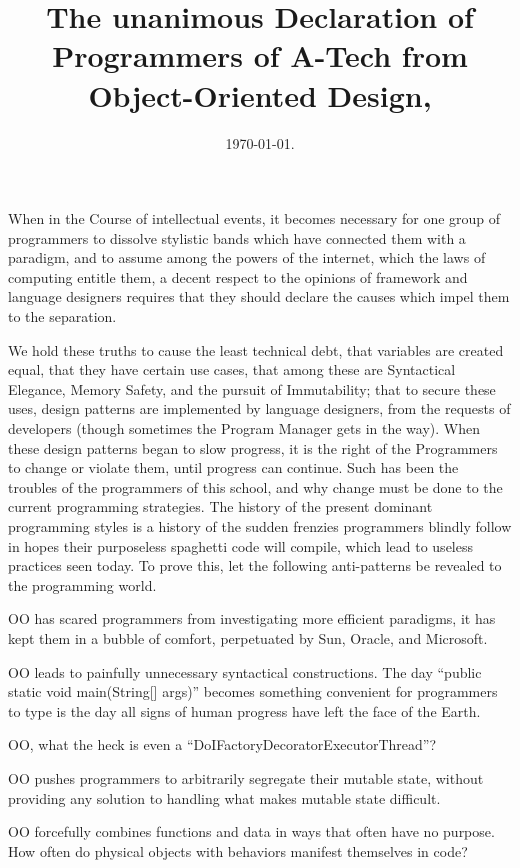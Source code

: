 \documentclass{article}
\title{The unanimous Declaration of Programmers of A-Tech from Object-Oriented Design,}
\date{\today.}
\begin{document}
\maketitle

When in the Course of intellectual events, it becomes necessary for one group of programmers to dissolve stylistic bands which have connected them with a paradigm, and to assume among the powers of the internet, which the laws of computing entitle them, a decent respect to the opinions of framework and language designers requires that they should declare the causes which impel them to the separation.

We hold these truths to cause the least technical debt, that variables are created equal, that they have certain use cases, that among these are Syntactical Elegance, Memory Safety, and the pursuit of Immutability; that to secure these uses, design patterns are implemented by language designers, from the requests of developers (though sometimes the Program Manager gets in the way). When these design patterns began to slow progress, it is the right of the Programmers to change or violate them, until progress can continue. Such has been the troubles of the programmers of this school, and why change must be done to the current programming strategies. The history of the present dominant programming styles is a history of the sudden frenzies programmers blindly follow in hopes their purposeless spaghetti code will compile, which lead to useless practices seen today. To prove this, let the following anti-patterns be revealed to the programming world.

OO has scared programmers from investigating more efficient paradigms, it has kept them in a bubble of comfort, perpetuated by Sun, Oracle, and Microsoft.

OO leads to painfully unnecessary syntactical constructions. The day ``public static void main(String[] args)'' becomes something convenient for programmers to type is the day all signs of human progress have left the face of the Earth.

OO, what the heck is even a ``DoIFactoryDecoratorExecutorThread''?

OO pushes programmers to arbitrarily segregate their mutable state, without providing any solution to handling what makes mutable state difficult.

OO forcefully combines functions and data in ways that often have no purpose. How often do physical objects with behaviors manifest themselves in code?
\end{document}
